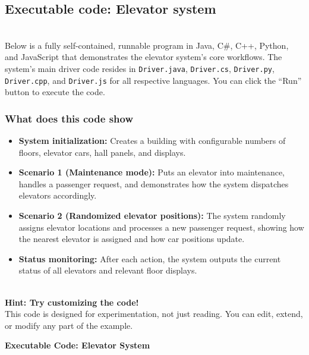 \subsection{Executable code: Elevator system}\label{fTyCWVARn6giv_Bc_HbW0}
\\
Below is a fully self-contained, runnable program in Java, C\#, C++, Python, and JavaScript that demonstrates the elevator system's core workflows. The system's main driver code resides in \texttt{Driver.java}, \texttt{Driver.cs}, \texttt{Driver.py}, \texttt{Driver.cpp}, and \texttt{Driver.js} for all respective languages. You can click the ``Run'' button to execute the code.

\subsubsection{What does this code show}\label{A5nDoF6viTeNaQQYFC7sR}

\begin{itemize}
\item
\protect{}\label{EvOdnOFpswh7z_J4gqOFq}
\textbf{System initialization:} Creates a building with configurable numbers of floors, elevator cars, hall panels, and displays.
\item
\protect{}\label{_7hKTPPqv1a8zmwTmjN1K}
\textbf{Scenario 1 (Maintenance mode):} Puts an elevator into maintenance, handles a passenger request, and demonstrates how the system dispatches elevators accordingly.
\item
\protect{}\label{9F0shktEiipnKICVv51lZ}
\textbf{Scenario 2 (Randomized elevator positions):} The system randomly assigns elevator locations and processes a new passenger request, showing how the nearest elevator is assigned and how car positions update.
\item
\protect{}\label{ndBE5Y7H_sNrebGadJv0E}
\textbf{Status monitoring:} After each action, the system outputs the current status of all elevators and relevant floor displays.
\end{itemize}
\\
\textbf{Hint: Try customizing the code!}
\\
This code is designed for experimentation, not just reading. You can edit, extend, or modify any part of the example.

\textbf{Executable Code: Elevator System}

